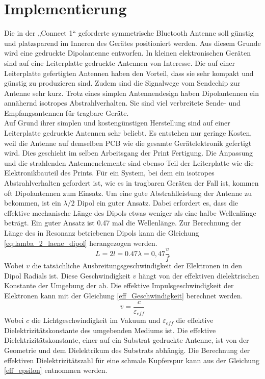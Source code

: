\section{Implementierung}\label{sec:Implementierung}
Die in der „Connect  1“ geforderte symmetrische Bluetooth Antenne soll günstig und platzsparend im Inneren des Gerätes positioniert werden. Aus diesem Grunde wird eine gedruckte Dipolantenne entworfen. In kleinen  elektronischen Geräten sind auf eine Leiterplatte gedruckte Antennen  von Interesse. Die auf einer Leiterplatte gefertigten Antennen haben den Vorteil, dass sie sehr kompakt und günstig zu produzieren sind. Zudem sind die Signalwege vom Sendechip zur Antenne sehr kurz. Trotz eines simplen Antennendesign haben Dipolantennen  ein annähernd isotropes Abstrahlverhalten. Sie sind viel verbreitete Sende- und Empfangsantennen für tragbare Geräte. \\

Auf Grund ihrer simplen und kostengünstigen  Herstellung sind auf  einer Leiterplatte gedruckte Antennen sehr beliebt. Es entstehen nur geringe Kosten, weil die Antenne auf demselben PCB wie die gesamte Gerätelektronik gefertigt wird. Dies geschieht im selben Arbeitsgang der Print Fertigung. Die  Anpassung und die strahlenden  Antennenelemente sind ebenso Teil der Leiterplatte wie die Elektronikbauteil des Prints. Für ein System, bei dem ein isotropes Abstrahlverhalten gefordert ist, wie es in tragbaren Geräten der Fall ist, kommen oft Dipolantennen zum Einsatz. 
Um eine gute Abstrahlleistung der Antenne zu bekommen, ist ein $\lambda /2$ Dipol ein guter Ansatz. Dabei erfordert es, dass die effektive mechanische Länge des Dipols etwas weniger als eine halbe Wellenlänge beträgt. Ein guter Ansatz ist 0.47 mal die Wellenlänge. 
Zur Berechnung der Länge des in Resonanz betriebenen Dipols kann die  Gleichung \ref{eq:lamba_2_laene_dipol} herangezogen werden.
\begin{equation}\label{eq:lamba_2_laene_dipol}
L=2l = 0.47 \lambda= 0,47 \dfrac{v}{f}
\end{equation} 
Wobei $v$ die tatsächliche Ausbreitungsgeschwindigkeit der Elektronen in den Dipol Radials ist. Diese Geschwindigkeit $v$ hängt von der effektiven dielektrischen Konstante der Umgebung der ab. 
Die effektive  Impulsgeschwindigkeit der Elektronen kann mit der Gleichung \ref{eff_Geschwindigkeit} berechnet werden. 
\begin{equation}\label{eff_Geschwindigkeit}
v = \dfrac{c}{\varepsilon_{eff}}
\end{equation}
Wobei $c$ die Lichtgeschwindigkeit im Vakuum und $\varepsilon_{eff}$  die effektive Dielektrizitätskonstante des umgebenden Mediums ist. Die effektive Dielektrizitätskonstante, einer auf ein Substrat gedruckte Antenne, ist von der  Geometrie und dem Dielektrikum des Substrats abhängig. Die Berechnung der effektiven Dielektrizitätszahl für eine schmale Kupferspur kann aus der Gleichung \ref{eff_epsilon} entnommen werden. 


